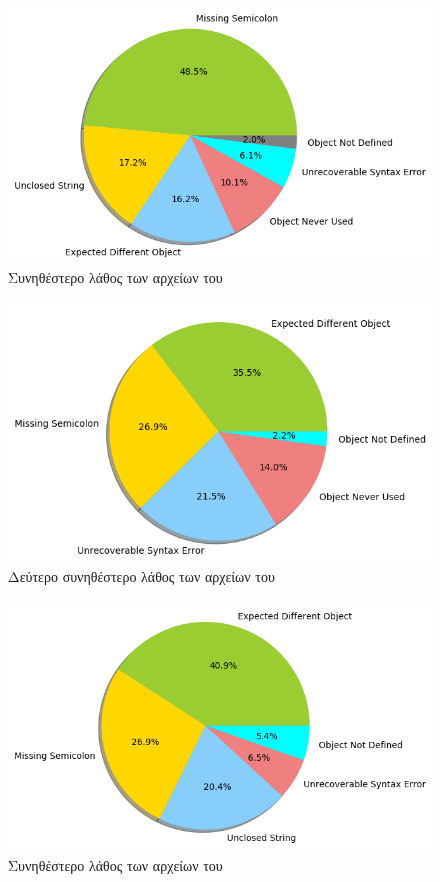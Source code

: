 \begin{figure}
	\includegraphics[width=\textwidth, keepaspectratio]{images/MCE-npmchar.png}
	\caption{Συνηθέστερο λάθος των αρχείων του }
	\label{MCE1-npmchar}
\end{figure}

\begin{figure}
	\includegraphics[width=\textwidth, keepaspectratio]{images/MCE2-npmchar.png}
	\caption{Δεύτερο συνηθέστερο λάθος των αρχείων του }
	\label{MCE2-npmchar}
\end{figure}

\begin{figure}
	\includegraphics[width=\textwidth, keepaspectratio]{images/MCE-npmlabeled.png}
	\caption{Συνηθέστερο λάθος των αρχείων του }
	\label{MCE1-npmlabeled}
\end{figure}

